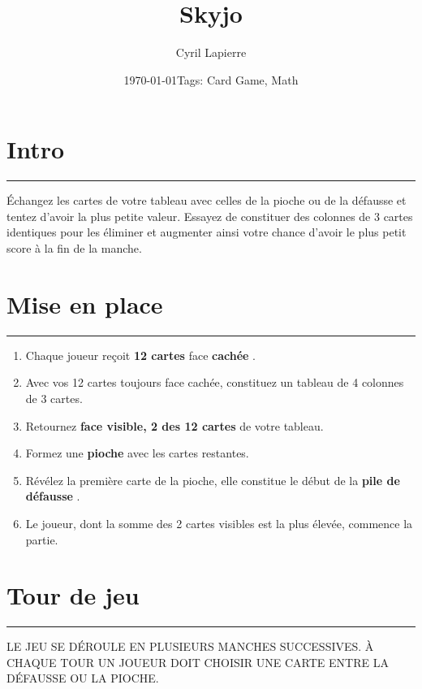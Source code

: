 \documentclass{scrartcl}%
\title{Skyjo}%
\author{Cyril Lapierre}%
\date{\today \break Tags: Card Game, Math}%
\begin{document}
%
\normalsize%
\maketitle\thispagestyle{header}%
\pagestyle{header}%
\sectionfont{\color{blue}}%
\subsectionfont{\color{blue}}%
\subsubsectionfont{\color{blue}}%
\section{ Intro
}%
\label{sec:Intro}%
\textcolor{blue}{\rule{18cm}{0.07cm}}\break%
Échangez les cartes de votre tableau avec celles de la pioche ou de la défausse et tentez d'avoir la plus petite valeur. Essayez de constituer des colonnes de 3 cartes identiques pour les éliminer et augmenter ainsi votre chance d'avoir le plus petit score à la fin de la manche.


%
\sectionfont{\color{mygreen}}%
\subsectionfont{\color{mygreen}}%
\subsubsectionfont{\color{mygreen}}%
\section{ Mise en place
}%
\label{sec:Miseenplace}%
\textcolor{mygreen}{\rule{18cm}{0.07cm}}\break%
\begin{enumerate}%
\item%
%
 Chaque joueur reçoit %
\textcolor{mygreen}{%
\textbf{12 cartes}%
}%
\textit{ }%
 face %
\textcolor{mygreen}{%
\textbf{cachée}%
}%
.
%
\item%
%
 Avec vos 12 cartes toujours face cachée, constituez un tableau de 4 colonnes de 3 cartes.
%
\item%
%
 Retournez %
\textcolor{mygreen}{%
\textbf{face visible, 2 des 12 cartes}%
}%
\textit{ }%
 de votre tableau.
%
\item%
%
 Formez une %
\textcolor{mygreen}{%
\textbf{pioche}%
}%
\textit{ }%
 avec les cartes restantes.
%
\item%
%
 Révélez la première carte de la pioche, elle constitue le début de la %
\textcolor{mygreen}{%
\textbf{pile de défausse}%
}%
.
%
\item%
%
 Le joueur, dont la somme des 2 cartes visibles est la plus élevée, commence la partie.
%
\end{enumerate}

%
\sectionfont{\color{red}}%
\subsectionfont{\color{red}}%
\subsubsectionfont{\color{red}}%
\section{ Tour de jeu
}%
\label{sec:Tourdejeu}%
\textcolor{red}{\rule{18cm}{0.07cm}}\break%
LE JEU SE DÉROULE EN PLUSIEURS MANCHES SUCCESSIVES. À CHAQUE TOUR UN JOUEUR DOIT CHOISIR UNE CARTE ENTRE LA DÉFAUSSE OU LA PIOCHE.
\end{document}
